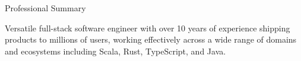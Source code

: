 \documentclass{resume} %
\begin{document}

\begin{rSection}{Professional Summary}

{Versatile full-stack software engineer with over 10 years of experience shipping products to millions of users, working effectively across a wide range of domains and ecosystems including Scala, Rust, TypeScript, and Java.}

\end{rSection}

\end{document}
